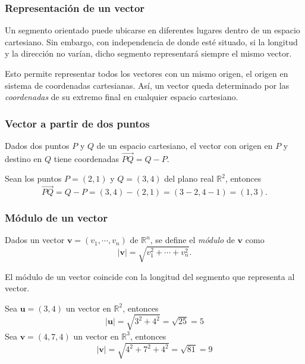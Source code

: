 \begin{frame}
\frametitle{Representación de un vector}
Un segmento orientado puede ubicarse en diferentes lugares dentro de un espacio cartesiano. 
Sin embargo, con independencia de donde esté situado, si la longitud y la dirección no varían, dicho segmento
representará siempre el mismo vector.

Esto permite representar todos los vectores con un mismo origen, el origen en sistema de coordenadas cartesianas.
Así, un vector queda determinado por las \emph{coordenadas} de su extremo final en cualquier espacio cartesiano.

\begin{center}
\scalebox{0.8}{}
\end{center}
\end{frame} 


\begin{frame}
\frametitle{Vector a partir de dos puntos}
Dados dos puntos $P$ y $Q$ de un espacio cartesiano, el vector con origen en $P$ y destino en $Q$ tiene coordenadas $\vec{PQ}=Q-P$.

Sean los puntos $P=(2,1)$  y $Q=(3,4)$ del plano real $\mathbb{R}^2$, entonces
\[
\vec{PQ} = Q-P = (3,4)-(2,1) = (3-2,4-1) = (1,3).
\]
\begin{center}
\scalebox{0.8}{}
\end{center}
\end{frame} 


\begin{frame}
\frametitle{Módulo de un vector}
\begin{definicion}
Dados un vector $\mathbf{v}=(v_1,\cdots,v_n)$ de $\mathbb{R}^n$, se define el \emph{módulo} de $\mathbf{v}$ como
\[
|\mathbf{v}| = \sqrt{v_1^2+ \cdots + v_n^2}.
\]
\end{definicion}
El módulo de un vector coincide con la longitud del segmento que representa al vector.

Sea $\mathbf{u}=(3,4)$ un vector en $\mathbb{R}^2$, entonces
\[
|\mathbf{u}| = \sqrt{3^2+4^2} = \sqrt{25} = 5
\]
Sea $\mathbf{v}=(4,7,4)$ un vector en $\mathbb{R}^3$, entonces
\[
|\mathbf{v}| = \sqrt{4^2+7^2+4^2} = \sqrt{81} = 9
\]
\end{frame} 


